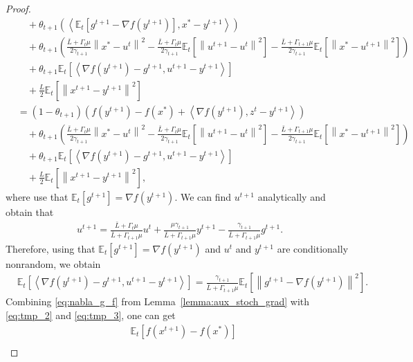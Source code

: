 \documentclass{article} %
\newcommand{\norm}[1]{\left\| #1 \right\|}
\newcommand{\inp}[2]{\left\langle#1,#2\right\rangle} %
\newcommand{\ExpSub}[2]{{\mathbb{E}}_{#1}\left[#2\right]}
\theoremstyle{plain}
\theoremstyle{definition}
\theoremstyle{remark}
\begin{document}
\begin{proof}
\begin{equation}
\begin{aligned}
  &\quad+ \theta_{t+1} \left(\inp{\ExpSub{t}{g^{t+1} - \nabla f(y^{t+1})}}{x^* - y^{t+1}}\right) \\
  &\quad+ \theta_{t+1} \left(\frac{\bar{L} + \Gamma_{t} \mu}{2 \gamma_{t+1}} \norm{x^* - u^t}^2 - \frac{\bar{L} + \Gamma_{t} \mu}{2 \gamma_{t+1}} \ExpSub{t}{\norm{u^{t+1} - u^t}^2} - \frac{\bar{L} + \Gamma_{t+1} \mu}{2 \gamma_{t+1}} \ExpSub{t}{\norm{x^* - u^{t+1}}^2}\right) \\
  &\quad+ \theta_{t+1} \ExpSub{t}{\inp{\nabla f(y^{t+1}) - g^{t+1}}{u^{t+1} - y^{t+1}}} \\
  &\quad+ \frac{L}{2} \ExpSub{t}{\norm{x^{t+1} - y^{t+1}}^2} \\
  &= (1 - \theta_{t+1}) \left(f(y^{t+1}) - f(x^*) + \inp{\nabla f(y^{t+1})}{z^t - y^{t+1}}\right) \\
  &\quad+ \theta_{t+1} \left(\frac{\bar{L} + \Gamma_{t} \mu}{2 \gamma_{t+1}} \norm{x^* - u^t}^2 - \frac{\bar{L} + \Gamma_{t} \mu}{2 \gamma_{t+1}} \ExpSub{t}{\norm{u^{t+1} - u^t}^2} - \frac{\bar{L} + \Gamma_{t+1} \mu}{2 \gamma_{t+1}} \ExpSub{t}{\norm{x^* - u^{t+1}}^2}\right) \\
  &\quad+ \theta_{t+1} \ExpSub{t}{\inp{\nabla f(y^{t+1}) - g^{t+1}}{u^{t+1} - y^{t+1}}} \\
  &\quad+ \frac{L}{2} \ExpSub{t}{\norm{x^{t+1} - y^{t+1}}^2},
  \label{eq:tmp_2}
\end{aligned}
\end{equation}
where use that $\ExpSub{t}{g^{t+1}} = \nabla f(y^{t+1}).$ We can find $u^{t+1}$ analytically and obtain that
\begin{align*}
  u^{t+1} = \frac{\bar{L} + \Gamma_{t} \mu}{\bar{L} + \Gamma_{t+1} \mu} u^t + \frac{\mu \gamma_{t+1}}{\bar{L} + \Gamma_{t+1} \mu} y^{t+1} - \frac{\gamma_{t+1}}{\bar{L} + \Gamma_{t+1} \mu} g^{t+1}.
\end{align*}
Therefore, using that $\ExpSub{t}{g^{t+1}} = \nabla f(y^{t+1})$ and $u^t$ and $y^{t+1}$ are conditionally nonrandom, we obtain
\begin{align}
  &\ExpSub{t}{\inp{\nabla f(y^{t+1}) - g^{t+1}}{u^{t+1} - y^{t+1}}} = \frac{\gamma_{t+1}}{\bar{L} + \Gamma_{t+1} \mu} \ExpSub{t}{\norm{g^{t+1} - \nabla f(y^{t+1})}^2}.
  \label{eq:tmp_3}
\end{align}
Combining \eqref{eq:nabla_g_f} from Lemma~\ref{lemma:aux_stoch_grad} with \eqref{eq:tmp_2} and \eqref{eq:tmp_3}, one can get
\begin{equation*}
  \begin{aligned}
    &\ExpSub{t}{f(x^{t+1}) - f(x^*)} \\

\end{aligned}
\end{equation*}
\end{proof}
\end{document}
